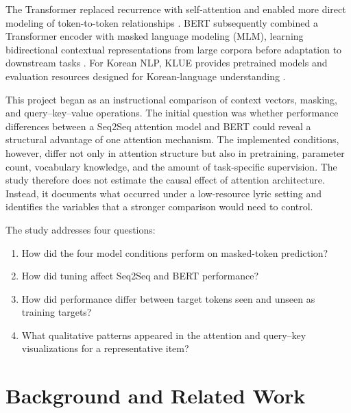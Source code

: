 \documentclass[10pt,letterpaper]{article}
\begin{document}
The Transformer replaced recurrence with self-attention and enabled more direct modeling of token-to-token relationships \parencite{vaswani2017}. BERT subsequently combined a Transformer encoder with masked language modeling (MLM), learning bidirectional contextual representations from large corpora before adaptation to downstream tasks \parencite{devlin2019}. For Korean NLP, KLUE provides pretrained models and evaluation resources designed for Korean-language understanding \parencite{park2021}.

This project began as an instructional comparison of context vectors, masking, and query--key--value operations. The initial question was whether performance differences between a Seq2Seq attention model and BERT could reveal a structural advantage of one attention mechanism. The implemented conditions, however, differ not only in attention structure but also in pretraining, parameter count, vocabulary knowledge, and the amount of task-specific supervision. The study therefore does not estimate the causal effect of attention architecture. Instead, it documents what occurred under a low-resource lyric setting and identifies the variables that a stronger comparison would need to control.

The study addresses four questions:
\begin{enumerate}[label=\textbf{RQ\arabic*.}]
\item How did the four model conditions perform on masked-token prediction?
\item How did tuning affect Seq2Seq and BERT performance?
\item How did performance differ between target tokens seen and unseen as training targets?
\item What qualitative patterns appeared in the attention and query--key visualizations for a representative item?
\end{enumerate}

\section{Background and Related Work}
\end{document}
